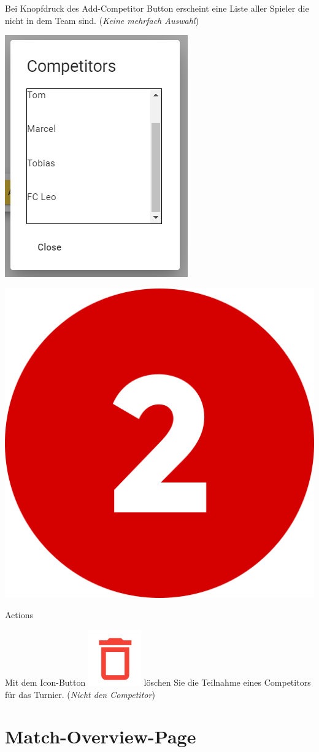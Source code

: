 Bei Knopfdruck des Add-Competitor Button erscheint eine Liste aller Spieler die nicht in dem Team sind.
(\textit{Keine mehrfach Auswahl})

\includegraphics[scale=0.4]{pics/user-guide/add-competitor.PNG}

\includegraphics[scale=0.05]{pics/user-guide/numbers/number-2.png} \begin{LARGE} Actions \end{LARGE}

Mit dem Icon-Button \includegraphics[scale=0.3]{pics/user-guide/delete-icon.PNG} löschen Sie die Teilnahme eines Competitors für das Turnier. (\textit{Nicht den Competitor})

\newpage
\section{Match-Overview-Page} 